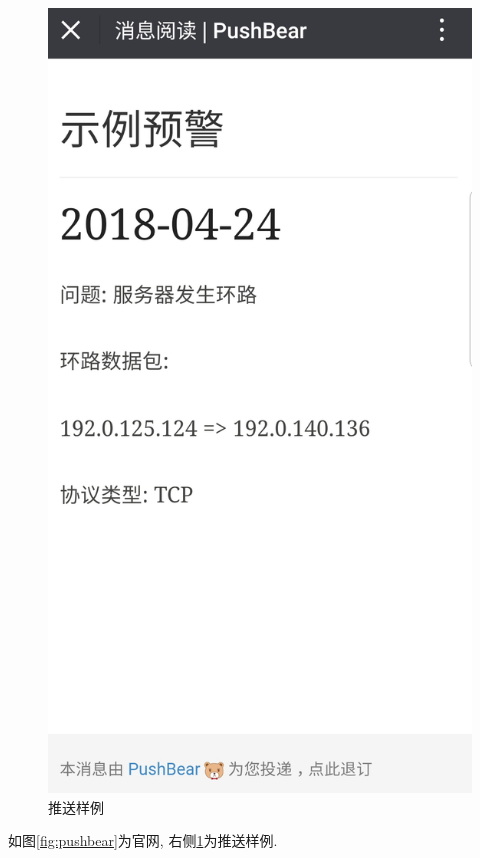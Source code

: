\begin{figure}[htbp]
\begin{minipage}{0.22\textwidth}
\centering
    \includegraphics[width=1\textwidth]{../img/push_example.jpg}
    \caption{推送样例}
    \label{fig:push_example}
\end{minipage}

\end{figure}

如图\ref{fig:pushbear}为官网, 右侧\ref{fig:push_example}为推送样例.

